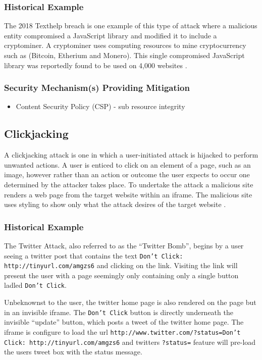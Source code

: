 \documentclass{mscreport}
\begin{document}
\subsubsection{Historical Example}
The 2018 Texthelp breach is one example of this type of attack where a malicious entity compromised a JavaScript library and modified it to include a cryptominer. A cryptominer uses computing resources to mine cryptocurrency such as (Bitcoin, Etherium and Monero). This single compromised JavaScript library was reportedly found to be used on 4,000 websites \cite{Billman2018-sq}.

\subsubsection{Security Mechanism(s) Providing Mitigation}

\begin{itemize}
	\setlength\itemsep{0.1em}
	\item Content Security Policy (CSP) - sub resource integrity
\end{itemize}

\subsection{Clickjacking}

A clickjacking attack is one in which a user-initiated attack is hijacked to perform unwanted actions. A user is enticed to click on an element of a page, such as an image, however rather than an action or outcome the user expects to occur one determined by the attacker takes place. To undertake the attack a malicious site renders a web page from the target website within an iframe. The malicious site uses styling to show only what the attack desires of the target website \cite{Jamwal2018-tz}.

\subsubsection{Historical Example}
The Twitter Attack, also referred to as the ``Twitter Bomb'', begins by a user seeing a twitter post that contains the text \texttt{Don't Click: http://tinyurl.com/amgzs6} \cite{Jani2015-kw} and clicking on the link. Visiting the link will present the user with a page seemingly only containing only a single button ladled \texttt{Don't Click}.

\vspace{0.3cm} \noindent
Unbeknownst to the user, the twitter home page is also rendered on the page but in an invisible iframe. The \texttt{Don't Click} button is directly underneath the invisible ``update'' button, which posts a tweet of the twitter home page. The iframe is configure to load the url \texttt{http://www.twitter.com/?status=Don't Click: http://tinyurl.com/amgzs6} \cite{Jani2015-kw} and twitters \texttt{?status=} feature will pre-load the users tweet box with the status message.
\end{document}
